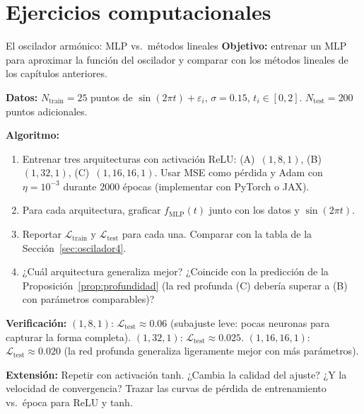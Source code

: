 \section*{Ejercicios computacionales}

\begin{ejerciciocomp}{El oscilador armónico: MLP vs.\ métodos lineales}
\label{ejcomp:oscilador4}
\textbf{Objetivo:} entrenar un MLP para aproximar la función del
oscilador y comparar con los métodos lineales de los capítulos
anteriores.

\medskip\noindent\textbf{Datos:}
$N_{\text{train}} = 25$ puntos de $\sin(2\pi t) + \varepsilon_i$,
$\sigma = 0.15$, $t_i \in [0, 2]$. $N_{\text{test}} = 200$ puntos
adicionales.

\medskip\noindent\textbf{Algoritmo:}
\begin{enumerate}
  \item Entrenar tres arquitecturas con activación ReLU:
        (A)~$(1, 8, 1)$, (B)~$(1, 32, 1)$, (C)~$(1, 16, 16, 1)$.
        Usar MSE como pérdida y Adam con $\eta = 10^{-3}$ durante
        $2000$ épocas (implementar con PyTorch o JAX).
  \item Para cada arquitectura, graficar $f_{\text{MLP}}(t)$ junto
        con los datos y $\sin(2\pi t)$.
  \item Reportar $\mathcal{L}_{\text{train}}$ y
        $\mathcal{L}_{\text{test}}$ para cada una. Comparar con la
        tabla de la Sección~\ref{sec:oscilador4}.
  \item ¿Cuál arquitectura generaliza mejor? ¿Coincide con la
        predicción de la Proposición~\ref{prop:profundidad} (la red
        profunda (C) debería superar a (B) con parámetros comparables)?
\end{enumerate}

\medskip\noindent\textbf{Verificación:}
$(1, 8, 1)$: $\mathcal{L}_{\text{test}} \approx 0.06$ (subajuste leve:
pocas neuronas para capturar la forma completa).
$(1, 32, 1)$: $\mathcal{L}_{\text{test}} \approx 0.025$.
$(1, 16, 16, 1)$: $\mathcal{L}_{\text{test}} \approx 0.020$ (la red
profunda generaliza ligeramente mejor con más parámetros).

\medskip\noindent\textbf{Extensión:}
Repetir con activación tanh. ¿Cambia la calidad del ajuste? ¿Y la
velocidad de convergencia? Trazar las curvas de pérdida de
entrenamiento vs.\ época para ReLU y tanh.
\end{ejerciciocomp}

